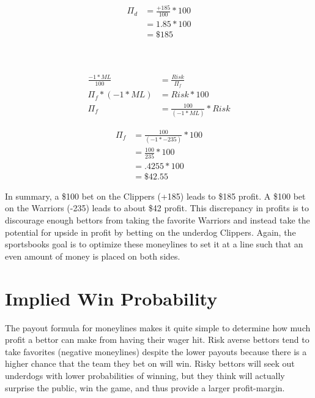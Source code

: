 \documentclass [MS] {uclathes}
\begin{document}
\noindent {}
\begin{equation*} 
\begin{split}
\Pi_{d} & = \frac{+185}{100} * 100 \\
 & = 1.85 * 100 \\
 & = \$185
\end{split}
\end{equation*}


\noindent {} \\
 \\
\begin{equation} \label{ml_prof_fav}
\begin{split}
\frac{-1 * ML}{100}  & = \frac{Risk}{\Pi_{f}}  \\
\Pi_{f} * (-1 * ML) & = Risk * 100  \\
\Pi_{f} & = \frac{100}{(-1 * ML)} * Risk 
\end{split}
\end{equation}

\noindent {}
\begin{equation*} 
\begin{split}
\Pi_{f} & =  \frac{100}{(-1 * -235)} * 100 \\
 & = \frac{100}{235} * 100 \\
 & = .4255 * 100 \\
 & = \$42.55
\end{split}
\end{equation*}

\noindent In summary, a \$100 bet on the Clippers (+185) leads to \$185 profit. A \$100 bet on the Warriors (-235) leads to about \$42 profit. This discrepancy in profits is to discourage enough bettors from taking the favorite Warriors and instead take the potential for upside in profit by betting on the underdog Clippers. Again, the sportsbooks goal is to optimize these moneylines to set it at a line such that an even amount of money is placed on both sides. \\

\section{Implied Win Probability}
The payout formula for moneylines makes it quite simple to determine how much profit a bettor can make from having their wager hit. Risk averse bettors tend to take favorites (negative moneylines) despite the lower payouts because there is a higher chance that the team they bet on will win. Risky bettors will seek out underdogs with lower probabilities of winning, but they think will actually surprise the public, win the game, and thus provide a larger profit-margin. \\
\end{document}
